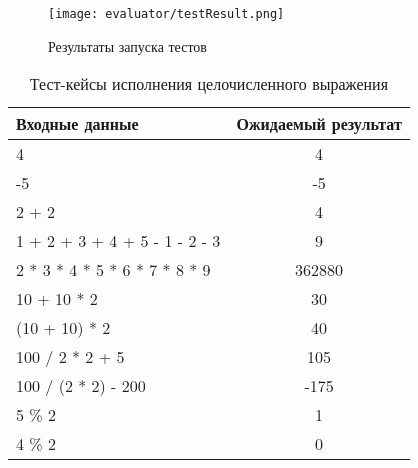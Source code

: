\begin{figure}[ht]
    \centering
    \vspace{\toppaddingoffigure}
    \texttt{[image: evaluator/testResult.png]}
    \caption{Результаты запуска тестов}
    \label{f:testResult}
\end{figure}

\clearpage

\begin{table}[!ht]
    \Large
    \centering
    \begin{threeparttable}
        \caption{Тест-кейсы исполнения целочисленного выражения}
        \label{t:testCases_infixIntExpr}
        \begin{tabularx}{\textwidth}{|X|c|}
            \hline
            Входные данные                & Ожидаемый результат \\
            \hline
            4                             & 4                   \\
            \hline
            -5                            & -5                  \\
            \hline
            2 + 2                         & 4                   \\
            \hline
            1 + 2 + 3 + 4 + 5 - 1 - 2 - 3 & 9                   \\
            \hline
            2 * 3 * 4 * 5 * 6 * 7 * 8 * 9 & 362880              \\
            \hline
            10 + 10 * 2                   & 30                  \\
            \hline
            (10 + 10) * 2                 & 40                  \\
            \hline
            100 / 2 * 2 + 5               & 105                 \\
            \hline
            100 / (2 * 2) - 200           & -175                \\
            \hline
            5 \% 2                        & 1                   \\
            \hline
            4 \% 2                        & 0                   \\
            \hline
        \end{tabularx}
    \end{threeparttable}
    \vspace{\bottompaddingoftable}
\end{table}


